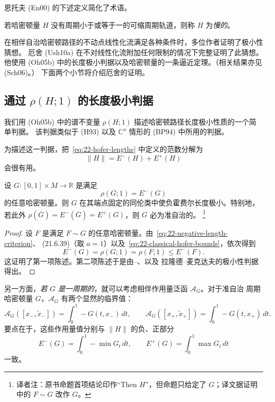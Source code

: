 恩托夫 (En00) 的下述定义简化了术语。

\begin{definition}
\label{def:22-slow-hamiltonian}
若哈密顿量 $H$ 没有周期小于或等于一的可缩周期轨道，则称 $H$ 为\emph{慢的}。
\end{definition}

在相伴自治哈密顿路径的不动点线性化流满足各种条件时，多位作者证明了极小性猜想。
厄舍 (Ush10a) 在不对线性化流附加任何限制的情况下完整证明了此猜想。他使用
(Oh05b) 中的长度极小判据以及哈密顿量的一条逼近定理。（相关结果亦见 (Sch06)。）
下面两个小节将介绍厄舍的证明。

\subsection{\texorpdfstring{通过 $\rho(H;1)$ 的长度极小判据}{通过 rho(H;1) 的长度极小判据}}

我们用 (Oh05b) 中的谱不变量 $\rho(H;1)$ 描述哈密顿路径长度极小性质的一个简单判据。
该判据类似于 (H93) 以及 $\mathbb C^n$ 情形的 (BP94) 中所用的判据。

为描述这一判据，把~\eqref{eq:22-hofer-lengths} 中定义的范数分解为
\[
 \lVert H\rVert=E^-(H)+E^+(H)
\]
会很有用。

\begin{proposition}
\label{prop:22-negative-length-minimizing}
设 $G:[0,1]\times M\to\mathbb R$ 是满足
\begin{equation}
 \rho(G;1)=E^-(G)
 \label{eq:22-negative-length-criterion}
\end{equation}
的任意哈密顿量。则 $G$ 在其端点固定的同伦类中使负霍费尔长度极小。特别地，若此外
$\rho(\overline G)=E^-(\overline G)=E^+(G)$，则 $G$ 必为准自治的。
\footnote{译者注：原书命题首项结论印作“Then $H$”，但命题只给定了 $G$；译文据证明
中的 $F\sim G$ 改作 $G$。}
\end{proposition}

\begin{proof}
设 $F$ 是满足 $F\sim G$ 的任意哈密顿量。由~\eqref{eq:22-negative-length-criterion}、
(21.6.39)（取 $a=1$）以及~\eqref{eq:22-classical-hofer-bounds}，依次得到
\[
 E^-(G)=\rho(G;1)=\rho(F;1)\leq E^-(F).
\]
这证明了第一项陈述。第二项陈述于是由\personBialy{}--\personPolterovich{}、\personUstilovsky{}以及
拉隆德--麦克达夫的极小性判据得出。
\end{proof}

另一方面，\emph{若 $G$ 是一周期的}，就可以考虑相伴作用量泛函 $\mathcal A_G$。对于准自治
周期哈密顿量 $G$，$\mathcal A_G$ 有两个显然的临界值：
\[
 \mathcal A_G([x_-,\widetilde x_-])
 =\int_0^1-G(t,x_-)\,dt,
 \qquad
 \mathcal A_G([x_+,\widetilde x_+])
 =\int_0^1-G(t,x_+)\,dt.
\]
要点在于，这些作用量值分别与 $\lVert H\rVert$ 的负、正部分
\[
 E^-(G)=\int_0^1-\min G_t\,dt,
 \qquad
 E^+(G)=\int_0^1\max G_t\,dt
\]
一致。



